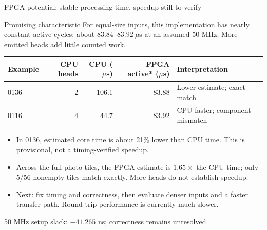 \documentclass[aspectratio=169,10pt]{beamer}
\begin{document}
\begin{frame}{FPGA potential: stable processing time, speedup still to verify}
\begin{block}{Promising characteristic}
For equal-size inputs, this implementation has nearly constant active cycles: about $83.84$--$83.92\ \mu$s at an assumed 50 MHz. More emitted heads add little counted work.
\end{block}
\small
\begin{tabular}{lrrrl}
\toprule
Example & CPU heads & CPU ($\mu$s) & FPGA active* ($\mu$s) & Interpretation \\
\midrule
0136 & 2 & 106.1 & 83.88 & Lower estimate; exact match \\
0116 & 4 & 44.7 & 83.92 & CPU faster; component mismatch \\
\bottomrule
\end{tabular}
\medskip
\begin{itemize}
\item In 0136, estimated core time is about 21\% lower than CPU time. This is provisional, not a timing-verified speedup.
\item Across the full-photo tiles, the FPGA estimate is $1.65\times$ the CPU time; only 5/56 nonempty tiles match exactly. More heads do not establish speedup.
\item Next: fix timing and correctness, then evaluate denser inputs and a faster transfer path. Round-trip performance is currently much slower.
\end{itemize}
\href{run:assets/demo.mp4}{}
\hfill\scriptsize *50 MHz setup slack: $-41.265$ ns; correctness remains unresolved.
\end{frame}
\end{document}
